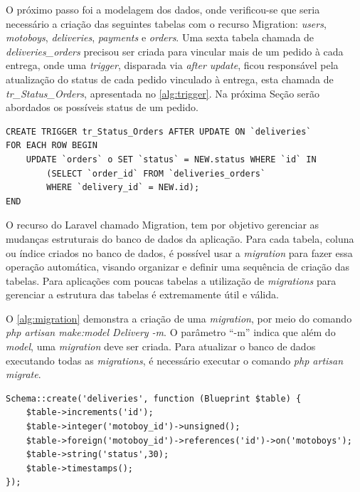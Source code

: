 O próximo passo foi a modelagem dos dados, onde verificou-se que seria necessário a criação das seguintes tabelas com o recurso Migration: \textit{users}, \textit{motoboys}, \textit{deliveries}, \textit{payments} e \textit{orders}. Uma sexta tabela chamada de \textit{deliveries\_orders} precisou ser criada para vincular mais de um pedido à cada entrega, onde uma \textit{trigger}, disparada via \textit{after update}, ficou responsável pela atualização do status de cada pedido vinculado à entrega, esta chamada de \textit{tr\_Status\_Orders}, apresentada no \autoref{alg:trigger}. Na próxima Seção serão abordados os possíveis status de um pedido.

\begin{lstlisting}[caption={Delivery Routes - Trigger tr\_Status\_Orders}, label=alg:trigger, style=SQL]
CREATE TRIGGER tr_Status_Orders AFTER UPDATE ON `deliveries`
FOR EACH ROW BEGIN
    UPDATE `orders` o SET `status` = NEW.status WHERE `id` IN
        (SELECT `order_id` FROM `deliveries_orders`
        WHERE `delivery_id` = NEW.id); 
END
\end{lstlisting}

O recurso do Laravel chamado Migration, tem por objetivo gerenciar as mudanças estruturais do banco de dados da aplicação. Para cada tabela, coluna ou índice criados no banco de dados, é possível usar a \textit{migration} para fazer essa operação automática, visando organizar e definir uma sequência de criação das tabelas. Para aplicações com poucas tabelas a utilização de \textit{migrations} para gerenciar a estrutura das tabelas é extremamente útil e válida.

O \autoref{alg:migration} demonstra a criação de uma \textit{migration}, por meio do comando \textit{php artisan make:model Delivery -m}. O parâmetro “-m” indica que além do \textit{model}, uma \textit{migration} deve ser criada.
Para atualizar o banco de dados executando todas as \textit{migrations}, é necessário executar o comando \textit{php artisan migrate}. 

\begin{lstlisting}[caption={Delivery Routes - Exemplo de migration}, style=htmlcssjs, label=alg:migration]
 Schema::create('deliveries', function (Blueprint $table) {
    $table->increments('id');
    $table->integer('motoboy_id')->unsigned();
    $table->foreign('motoboy_id')->references('id')->on('motoboys');
    $table->string('status',30);
    $table->timestamps();
});
\end{lstlisting}

